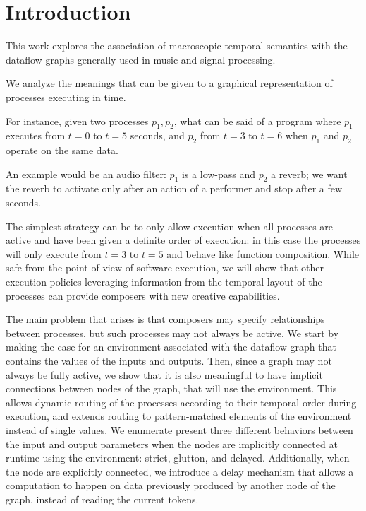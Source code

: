 \documentclass{article}
\author{Authors redacted}
\title{\papertitle}
\begin{document}
    
\capstartfalse
\maketitle
\capstarttrue
\begin{abstract}
\end{abstract}
    
\section{Introduction}
This work explores the association of macroscopic temporal semantics with the dataflow graphs generally used in music and signal processing.
    
We analyze the meanings that can be given to a graphical representation of processes executing in time. 
    
For instance, given two processes $p_1, p_2$, what can be said of a program where $p_1$ executes from $t=0$ to $t=5$ seconds, and $p_2$ from $t=3$ to $t=6$ when $p_1$ and $p_2$ operate on the same data.
    
An example would be an audio filter: $p_1$ is a low-pass and $p_2$ a reverb; we want the reverb to activate only after an action of a performer and stop after a few seconds.
    
The simplest strategy can be to only allow execution when all processes are active and have been given a definite order of execution: in this case the processes will only execute from $t=3$ to $t=5$ and behave like function composition. 
While safe from the point of view of software execution, we will show that other execution policies leveraging information from the temporal layout of the processes can provide composers with new creative capabilities.
    
The main problem that arises is that composers may specify relationships between processes, but such processes may not always be active. 
We start by making the case for an environment associated with the dataflow graph that contains the values of the inputs and outputs.
Then, since a graph may not always be fully active, we show that it is also meaningful to have implicit connections between nodes of the graph, that will use the environment.
This allows dynamic routing of the processes according to their temporal order during execution, and extends routing to pattern-matched elements of the environment instead of single values.
We enumerate present three different behaviors between the input and output parameters when the nodes are implicitly connected at runtime using the environment: strict, glutton, and delayed. 
Additionally, when the node are explicitly connected, we introduce a delay mechanism that allows a computation to happen on data previously produced by another node of the graph, instead of reading the current tokens.
    
\end{document}
